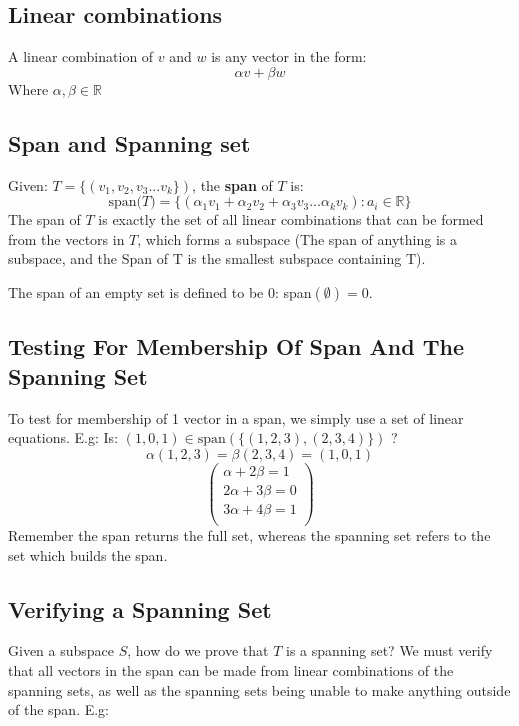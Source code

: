 \documentclass[11pt]{book}
\begin{document}
{\subsection{Linear combinations}
\par{A linear combination of $v$ and $w$ is any vector in the form: 
	\[
	\alpha v+\beta w
	\] 
Where $\alpha,\beta\in\mathbb{R}$}
\subsection{Span and Spanning set}
\par{Given: $T=\lbrace(v_{1},v_{2},v_{3}...v_{k}\rbrace)$, the \textbf{span} of $T$ is:
\[
	\text{span($T$)}=\lbrace\left(\alpha_{1}v_{1}+\alpha_{2}v_{2}+\alpha_{3}v_{3}...\alpha_{k}v_{k}\right): a_{i}\in\mathbb{R}\rbrace
\] 
The span of $T$ is exactly the set of all linear combinations that can be formed from the vectors in $T$, which forms a subspace (The span of anything is a subspace, and the Span of T is the smallest subspace containing T). 

The span of an empty set is defined to be 0: span$\left(\emptyset\right)=0$.
}
\subsection{Testing For Membership Of Span And The Spanning Set}
\par{To test for membership of 1 vector in a span, we simply use a set of linear equations. E.g:}
Is: $\left(1,0,1\right)\in\text{span}\left(\lbrace\left(1,2,3\right),\left(2,3,4\right)\rbrace\right)$ ?
$$\alpha\left(1,2,3\right)=\beta\left(2,3,4\right)=\left(1,0,1\right)$$
$$
\begin{pmatrix}
	\alpha +2\beta=1 \\
	2\alpha+3\beta=0 \\
	3\alpha+4\beta=1 \\
\end{pmatrix}
$$
Remember the span returns the full set, whereas the spanning set refers to the set which builds the span.
\subsection{Verifying a Spanning Set}
\par{Given a subspace $S$, how do we prove that $T$ is a spanning set? We must verify that all vectors in the span can be made from linear combinations of the spanning sets, as well as the spanning sets being unable to make anything outside of the span. E.g:

}}
\end{document}
